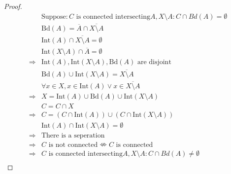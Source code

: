 \documentclass{article}
\begin{document}
\begin{proof}
    \begin{align*}
        &\text{Suppose}: C\text{ is connected intersecting} A,X\setminus A:C\cap Bd(A)=\emptyset\\
        &\text{Bd}(A)=\overline{A}\cap\overline{X\setminus A}\\
        &\text{Int}(A)\cap\overline{X\setminus A}=\emptyset\\
        &\text{Int}(X\setminus A)\cap \overline{A}=\emptyset\\
        \Rightarrow&\text{Int}(A),\text{Int}(X\setminus A),\text{Bd}(A)\text{ are disjoint}\\
        &\text{Bd}(A)\cup\text{Int}(X\setminus A)=\overline{X\setminus A}\\
        &\forall x\in X,x\in \text{Int}(A)\lor x\in \overline{X\setminus A}\\
        \Rightarrow&X=\text{Int}(A)\cup\text{Bd}(A)\cup\text{Int}(X\setminus A)\\
        &C=C\cap X\\
        \Rightarrow&C=(C\cap\text{Int}(A))\cup(C\cap \text{Int}(X\setminus A))\\
        &\text{Int}(A)\cap\text{Int}(X\setminus A)=\emptyset\\
        \Rightarrow&\text{There is a seperation}\\
        \Rightarrow&C\text{ is not connected}\nLeftrightarrow C\text{ is connected}\\
        \Rightarrow&C\text{ is connected intersecting} A,X\setminus A:C\cap Bd(A)\ne\emptyset\\
    \end{align*}
\end{proof}
\end{document}

